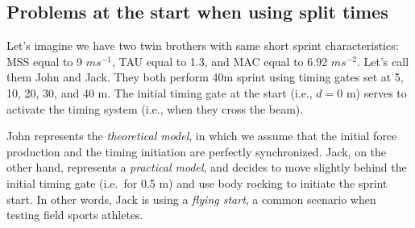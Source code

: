 \documentclass[fleqn,10pt,lineno]{wlpeerj} %
\newenvironment{Shaded}{\begin{snugshade}}{\end{snugshade}}
\newcommand{\AttributeTok}[1]{\textcolor[rgb]{0.77,0.63,0.00}{#1}}
\newcommand{\CommentTok}[1]{\textcolor[rgb]{0.56,0.35,0.01}{\textit{#1}}}
\newcommand{\DecValTok}[1]{\textcolor[rgb]{0.00,0.00,0.81}{#1}}
\newcommand{\FloatTok}[1]{\textcolor[rgb]{0.00,0.00,0.81}{#1}}
\newcommand{\FunctionTok}[1]{\textcolor[rgb]{0.00,0.00,0.00}{#1}}
\newcommand{\NormalTok}[1]{#1}
\newcommand{\OtherTok}[1]{\textcolor[rgb]{0.56,0.35,0.01}{#1}}
\newcommand{\SpecialCharTok}[1]{\textcolor[rgb]{0.00,0.00,0.00}{#1}}
\newcommand{\StringTok}[1]{\textcolor[rgb]{0.31,0.60,0.02}{#1}}
\begin{document}
\begin{Shaded}
\end{Shaded}

\hypertarget{problems-at-the-start-when-using-split-times}{%
\subsection{Problems at the start when using split times}\label{problems-at-the-start-when-using-split-times}}

Let's imagine we have two twin brothers with same short sprint characteristics: MSS equal to 9 \(ms^{-1}\), TAU equal to 1.3, and MAC equal to 6.92 \(ms^{-2}\). Let's call them John and Jack. They both perform 40m sprint using timing gates set at 5, 10, 20, 30, and 40 m. The initial timing gate at the start (i.e., \(d=0\) m) serves to activate the timing system (i.e., when they cross the beam).

John represents the \emph{theoretical model}, in which we assume that the initial force production and the timing initiation are perfectly synchronized. Jack, on the other hand, represents a \emph{practical model}, and decides to move slightly behind the initial timing gate (i.e.~for 0.5 m) and use body rocking to initiate the sprint start. In other words, Jack is using a \emph{flying start}, a common scenario when testing field sports athletes.
\end{document}
